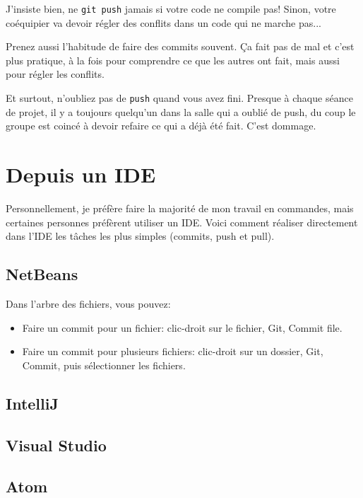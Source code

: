 \documentclass[10pt,a4paper]{article}
\begin{document}
J'insiste bien, ne {\tt git push} jamais si votre code ne compile pas! Sinon, votre coéquipier va devoir régler des conflits dans un code qui ne marche pas...

Prenez aussi l'habitude de faire des commits souvent. Ça fait pas de mal et c'est plus pratique, à la fois pour comprendre ce que les autres ont fait, mais aussi pour régler les conflits.

Et surtout, n'oubliez pas de {\tt push} quand vous avez fini. Presque à chaque séance de projet, il y a toujours quelqu'un dans la salle qui a oublié de push, du coup le groupe est coincé à devoir refaire ce qui a déjà été fait. C'est dommage.

\section{Depuis un IDE}

Personnellement, je préfère faire la majorité de mon travail en commandes, mais certaines personnes préfèrent utiliser un IDE. Voici comment réaliser directement dans l'IDE les tâches les plus simples (commits, push et pull).

\subsection{NetBeans}

Dans l'arbre des fichiers, vous pouvez:

\begin{itemize}
\item Faire un commit pour un fichier: clic-droit sur le fichier, Git, Commit file.
\item Faire un commit pour plusieurs fichiers: clic-droit sur un dossier, Git, Commit, puis sélectionner les fichiers.
\end{itemize}

\subsection{IntelliJ}

\subsection{Visual Studio}

\subsection{Atom}
\end{document}
